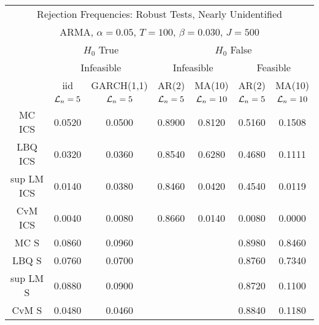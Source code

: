 \begin{table}[H] 
 \tiny 
 \centering 
\begin{tabular}{|c|c|c||c|c|c|c|} 
\multicolumn{7}{c}{ Rejection Frequencies: Robust Tests, Nearly Unidentified } \\ 
\multicolumn{7}{c}{ ARMA, $\alpha = 0.05$, $T=100$, $\beta = 0.030$, $J=500$ } \\ 
  \multicolumn{1}{c}{ } & \multicolumn{2}{c}{ $H_{0}$ True} & \multicolumn{4}{c}{ $H_{0}$ False} \\ 
  \multicolumn{1}{c}{ } & \multicolumn{2}{c}{ Infeasible } & \multicolumn{2}{c}{ Infeasible } & \multicolumn{2}{c}{ Feasible} \\ 
 \hline 
 & iid & GARCH(1,1) & AR(2) & MA(10) & AR(2) & MA(10)  \\ 
 & $\mathcal{L}_n=5$ & $\mathcal{L}_n=5$ & $\mathcal{L}_n=5$ & $\mathcal{L}_n=10$ & $\mathcal{L}_n=5$ & $\mathcal{L}_n=10$   \\ 
 \hline 
 MC ICS &  0.0520 &  0.0500 &  0.8900 &  0.8120 & 0.5160 &  0.1508 \\ 
 LBQ ICS &  0.0320 &  0.0360 &  0.8540 &  0.6280 & 0.4680 &  0.1111  \\ 
 sup LM ICS &  0.0140 &  0.0380 &  0.8460 &  0.0420 & 0.4540 &  0.0119  \\ 
 CvM ICS &  0.0040 &  0.0080 &  0.8660 &  0.0140 & 0.0080 &  0.0000  \\ 
 \hline 
 MC S &  0.0860 &  0.0960 & & &  0.8980 &  0.8460  \\ 
 LBQ S &  0.0760 &  0.0700 & & &  0.8760 &  0.7340  \\ 
 sup LM S &  0.0880 &  0.0900 & & &  0.8720 &  0.1100  \\ 
 CvM S &  0.0480 &  0.0460 & & &  0.8840 &  0.1180  \\ 
 \hline 
\end{tabular}
 \end{table}

